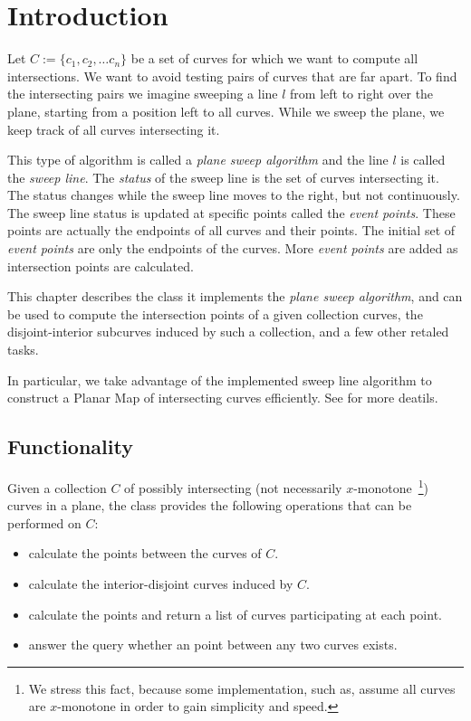 \section{Introduction}

Let $C:=\{c_1,c_2, \ldots c_n\}$ be a set of curves for which we want 
to compute all intersections. We want to avoid testing pairs of curves 
that are far apart. To find the intersecting pairs we imagine sweeping  
a line $l$ from left to right over the plane, starting from a position 
left to all curves. While we sweep the plane, we keep track of all 
curves intersecting it.

This type of algorithm is called a {\em plane sweep algorithm} and the line 
$l$ is called the {\em sweep line}. The {\em status} of the sweep line is 
the set of curves intersecting it. The status changes while the sweep line 
moves to the right, but not continuously. The sweep line status is updated at 
specific points called the {\em event points}. These points are actually
the endpoints of all curves and their  points.
The initial set of 
{\em event points} are only the endpoints of the curves. More
{\em event points} are added as intersection points are calculated.

This chapter describes the  class it implements the
{\em plane sweep algorithm}, and can be used to compute the
intersection points of a given collection curves, the disjoint-interior
subcurves induced by such a collection, and a few other retaled tasks.

In particular, we take advantage of the implemented sweep line algorithm to
construct a Planar Map of intersecting curves efficiently. See 
 for more deatils.

\subsection{Functionality}
Given a collection $C$ of possibly intersecting (not necessarily
$x$-monotone~\footnote{We stress this fact, because some implementation,
such as,  assume all curves are $x$-monotone 
in order to gain simplicity and speed.}) curves in a plane, the
 class provides the following operations that can be
performed on $C$:

\begin{itemize}
\item calculate the  points between the curves
  of $C$. 
\item calculate the interior-disjoint curves induced by $C$.
\item calculate the  points and return a list
  of curves participating at each  point.
\item answer the query whether an  point between
  any two curves exists.
\end{itemize}


